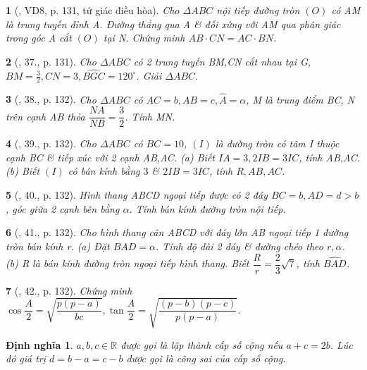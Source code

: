 \documentclass{article}
\newtheorem{baitoan}{}
\newtheorem{dinhnghia}{Định nghĩa}
\begin{document}
\begin{baitoan}[\cite{TLCT_hinh_hoc_10}, VD8, p. 131, tứ giác điều hòa]
	Cho $\Delta ABC$ nội tiếp đường tròn $(O)$ có AM là trung tuyến đỉnh A. Đường thẳng qua A \& đối xứng với AM qua phân giác trong góc A cắt $(O)$ tại N. Chứng minh $AB\cdot CN = AC\cdot BN$.
\end{baitoan}

\begin{baitoan}[\cite{TLCT_hinh_hoc_10}, 37., p. 131]
	Cho $\Delta ABC$ có 2 trung tuyến BM,CN cắt nhau tại G, $BM = \frac{3}{2},CN = 3,\widehat{BGC} = 120^\circ$. Giải $\Delta ABC$.
\end{baitoan}

\begin{baitoan}[\cite{TLCT_hinh_hoc_10}, 38., p. 132]
	Cho $\Delta ABC$ có $AC = b,AB = c,\widehat{A} = \alpha$, M là trung điểm BC, N trên cạnh AB thỏa $\dfrac{NA}{NB} = \dfrac{3}{2}$. Tính MN.
\end{baitoan}

\begin{baitoan}[\cite{TLCT_hinh_hoc_10}, 39., p. 132]
	Cho $\Delta ABC$ có $BC = 10$, $(I)$ là đường tròn có tâm I thuộc cạnh BC \& tiếp xúc với 2 cạnh AB,AC. (a) Biết $IA = 3,2IB = 3IC$, tính AB,AC. (b) Biết $(I)$ có bán kính bằng $3$ \& $2IB = 3IC$, tính $R,AB,AC$.
\end{baitoan}

\begin{baitoan}[\cite{TLCT_hinh_hoc_10}, 40., p. 132]
	Hình thang ABCD ngoại tiếp được có 2 đáy $BC = b,AD = d > b$, góc giữa 2 cạnh bên bằng $\alpha$. Tính bán kính đường tròn nội tiếp.
\end{baitoan}

\begin{baitoan}[\cite{TLCT_hinh_hoc_10}, 41., p. 132]
	Cho hình thang cân ABCD với đáy lớn AB ngoại tiếp 1 đường tròn bán kính r. (a) Đặt $\widehat{BAD} = \alpha$. Tính độ dài 2 đáy \& đường chéo theo $r,\alpha$. (b) R là bán kính đường tròn ngoại tiếp hình thang. Biết $\dfrac{R}{r} = \dfrac{2}{3}\sqrt{7}$, tính $\widehat{BAD}$.
\end{baitoan}

\begin{baitoan}[\cite{TLCT_hinh_hoc_10}, 42., p. 132]
	Chứng minh $\cos\dfrac{A}{2} = \sqrt{\dfrac{p(p - a)}{bc}},\tan\dfrac{A}{2} = \sqrt{\dfrac{(p - b)(p - c)}{p(p - a)}}$.
\end{baitoan}

\begin{dinhnghia}
	$a,b,c\in\mathbb{R}$ được gọi là lập thành {\rm cấp số cộng} nếu $a + c = 2b$. Lúc đó giá trị $d = b - a = c - b$ được gọi là {\rm công sai} của cấp số cộng.
\end{dinhnghia}
\end{document}
